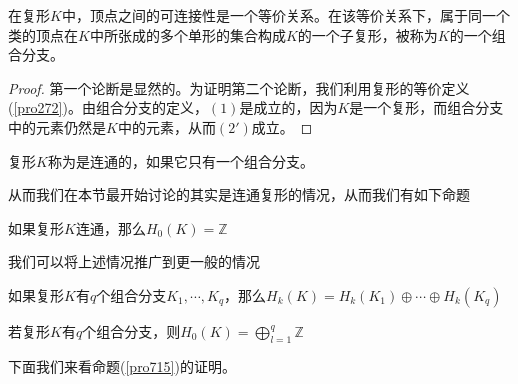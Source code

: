 \begin{proposition}
在复形$K$中，顶点之间的可连接性是一个等价关系。在该等价关系下，属于同一个类的顶点在$K$中所张成的多个单形的集合构成$K$的一个子复形，被称为$K$的一个组合分支。
\end{proposition}
\begin{proof}
第一个论断是显然的。为证明第二个论断，我们利用复形的等价定义(\ref{pro272})。由组合分支的定义，$(1)$是成立的，因为$K$是一个复形，而组合分支中的元素仍然是$K$中的元素，从而$(2')$成立。
\end{proof}
\begin{definition}
复形$K$称为是连通的，如果它只有一个组合分支。
\end{definition}
从而我们在本节最开始讨论的其实是连通复形的情况，从而我们有如下命题
\begin{proposition}\label{pro711}
如果复形$K$连通，那么$H_{0}(K)=\mathbb{Z}$
\end{proposition}
我们可以将上述情况推广到更一般的情况
\begin{proposition}\label{pro715}
如果复形$K$有$q$个组合分支$K_{1},\cdots,K_{q}$，那么$H_{k}(K)=H_{k}(K_{1})\oplus\cdots\oplus H_{k}(K_{q})$
\end{proposition}
\begin{corollary}
若复形$K$有$q$个组合分支，则$H_{0}(K)=\bigoplus\limits_{l=1}^{q}\mathbb{Z}$
\end{corollary}
下面我们来看命题(\ref{pro715})的证明。
